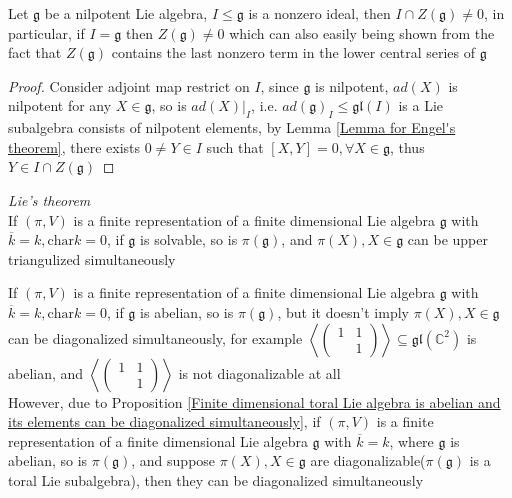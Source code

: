\documentclass[main]{subfiles}
\begin{document}
\begin{lemma}\label{g nilpotent, I ideal => I intersect Z(g) is nontrivial}
Let $\mathfrak{g}$ be a nilpotent Lie algebra, $I\leq\mathfrak{g}$ is a nonzero ideal, then $I\cap Z(\mathfrak{g})\neq0$, in particular, if $I=\mathfrak{g}$ then $Z(\mathfrak{g})\neq 0$ which can also easily being shown from the fact that $Z(\mathfrak{g})$ contains the last nonzero term in the lower central series of $\mathfrak{g}$
\end{lemma}

\begin{proof}
Consider adjoint map restrict on $I$, since $\mathfrak{g}$ is nilpotent, $ad(X)$ is nilpotent for any $X\in\mathfrak{g}$, so is $ad(X)|_{I}$, i.e. $ad(\mathfrak{g})_I\leq \mathfrak{gl}(I)$ is a Lie subalgebra consists of nilpotent elements, by Lemma \ref{Lemma for Engel's theorem}, there exists $0\neq Y\in I$ such that $[X,Y]=0,\forall X\in\mathfrak{g}$, thus $Y\in I\cap Z(\mathfrak{g})$
\end{proof}

\begin{theorem}\textit{Lie's theorem}\label{Lie's theorem} \\
If $(\pi,V)$ is a finite representation of a finite dimensional Lie algebra $\mathfrak{g}$ with $\overline{k}=k,\mathrm{char}k=0$, if $\mathfrak{g}$ is solvable, so is $\pi(\mathfrak{g})$, and $\pi(X),X\in\mathfrak{g}$ can be upper triangulized simultaneously
\end{theorem}

\begin{remark}
If $(\pi,V)$ is a finite representation of a finite dimensional Lie algebra $\mathfrak{g}$ with $\overline{k}=k,\mathrm{char}k=0$, if $\mathfrak{g}$ is abelian, so is $\pi(\mathfrak{g})$, but it doesn't imply $\pi(X),X\in\mathfrak{g}$ can be diagonalized simultaneously, for example $\left\langle\begin{pmatrix}
1&1 \\
&1
\end{pmatrix}\right\rangle\subseteq\mathfrak{gl}(\mathbb{C}^2)$ is abelian, and $\left\langle\begin{pmatrix}
1&1 \\
&1
\end{pmatrix}\right\rangle$ is not diagonalizable at all \\
However, due to Proposition \ref{Finite dimensional toral Lie algebra is abelian and its elements can be diagonalized simultaneously}, if $(\pi,V)$ is a finite representation of a finite dimensional Lie algebra $\mathfrak{g}$ with $\overline{k}=k$, where $\mathfrak{g}$ is abelian, so is $\pi(\mathfrak{g})$, and suppose $\pi(X),X\in\mathfrak{g}$ are diagonalizable($\pi(\mathfrak{g})$ is a toral Lie subalgebra), then they can be diagonalized simultaneously
\end{remark}
\end{document}
